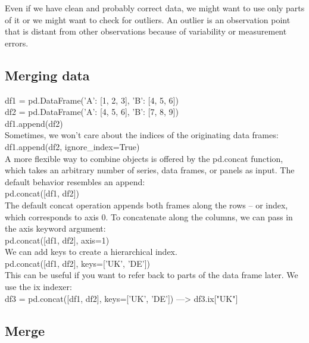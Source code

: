 \documentclass{article}
\numberwithin{equation}{section} %
\begin{document}
Even if we have clean and probably correct data, we might want to use only parts
of it or we might want to check for outliers. An outlier is an observation point that is distant from other observations because of variability or measurement errors. \\

\subsection*{Merging data}

df1 = pd.DataFrame({'A': [1, 2, 3], 'B': [4, 5, 6]}) \\

df2 = pd.DataFrame({'A': [4, 5, 6], 'B': [7, 8, 9]}) \\

df1.append(df2) \\

Sometimes, we won't care about the indices of the originating data frames: \\

df1.append(df2, ignore\_index=True) \\

A more flexible way to combine objects is offered by the pd.concat function, which
takes an arbitrary number of series, data frames, or panels as input. The default
behavior resembles an append: \\

pd.concat([df1, df2]) \\

The default concat operation appends both frames along the rows – or index, which
corresponds to axis 0. To concatenate along the columns, we can pass in the axis
keyword argument: \\

pd.concat([df1, df2], axis=1) \\

We can add keys to create a hierarchical index. \\

pd.concat([df1, df2], keys=['UK', 'DE']) \\

This can be useful if you want to refer back to parts of the data frame later. We use the ix indexer: \\

df3 = pd.concat([df1, df2], keys=['UK', 'DE']) --->  df3.ix["UK"] \\

\subsection*{Merge}
\end{document}
